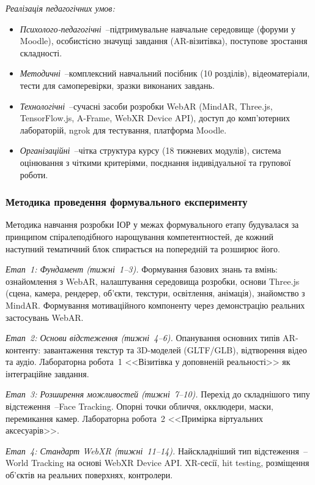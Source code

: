\textit{Реалізація педагогічних умов:}
\begin{itemize}
\item \textit{Психолого-педагогічні}~--підтримувальне навчальне середовище (форуми у Moodle), особистісно значущі завдання (AR-візитівка), поступове зростання складності.
\item \textit{Методичні}~--комплексний навчальний посібник (10 розділів), відеоматеріали, тести для самоперевірки, зразки виконаних завдань.
\item \textit{Технологічні}~--сучасні засоби розробки WebAR (MindAR, Three.js, TensorFlow.js, A-Frame, WebXR Device API), доступ до комп'ютерних лабораторій, ngrok для тестування, платформа Moodle.
\item \textit{Організаційні}~--чітка структура курсу (18 тижневих модулів), система оцінювання з чіткими критеріями, поєднання індивідуальної та групової роботи.
\end{itemize}

\subsubsection{Методика проведення формувального експерименту}

Методика навчання розробки ІОР у межах формувального етапу будувалася за принципом спіралеподібного нарощування компетентностей, де кожний наступний тематичний блок спирається на попередній та розширює його.

\textit{Етап~1: Фундамент (тижні~1--3).} Формування базових знань та вмінь: ознайомлення з WebAR, налаштування середовища розробки, основи Three.js (сцена, камера, рендерер, об'єкти, текстури, освітлення, анімація), знайомство з MindAR. Формування мотиваційного компоненту через демонстрацію реальних застосувань WebAR.

\textit{Етап~2: Основи відстеження (тижні~4--6).} Опанування основних типів AR-контенту: завантаження текстур та 3D-моделей (GLTF/GLB), відтворення відео та аудіо. Лабораторна робота~1 <<Візитівка у доповненій реальності>> як інтеграційне завдання.

\textit{Етап~3: Розширення можливостей (тижні~7--10).} Перехід до складнішого типу відстеження~--Face Tracking. Опорні точки обличчя, окклюдери, маски, перемикання камер. Лабораторна робота~2 <<Примірка віртуальних аксесуарів>>.

\textit{Етап~4: Стандарт WebXR (тижні~11--14).} Найскладніший тип відстеження~--World Tracking на основі WebXR Device API. XR-сесії, hit testing, розміщення об'єктів на реальних поверхнях, контролери.

